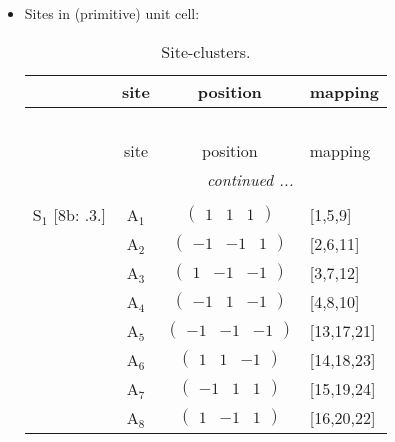 \documentclass[fleqn,10pt,landscape]{article}
\begin{document}
\begin{itemize}
\item Sites in (primitive) unit cell:
\begin{center}
\renewcommand{\arraystretch}{1.3}
\begin{longtable}{cc|c|l}
\caption{Site-clusters.}
 \\
 \hline \hline
 & site & position & mapping \\ \hline \endfirsthead

\multicolumn{3}{l}{\tablename\ \thetable{}} \\
 \hline \hline
 & site & position & mapping \\ \hline \endhead

 \hline \hline
\multicolumn{3}{r}{\footnotesize\it continued ...} \\ \endfoot

 \hline \hline
\multicolumn{3}{r}{} \\ \endlastfoot

S$_{1}$ [8b: .3.] & A$_1$ & $\begin{pmatrix} 1 & 1 & 1 \end{pmatrix}$ & [1,5,9] \\
& A$_2$ & $\begin{pmatrix} -1 & -1 & 1 \end{pmatrix}$ & [2,6,11] \\
& A$_3$ & $\begin{pmatrix} 1 & -1 & -1 \end{pmatrix}$ & [3,7,12] \\
& A$_4$ & $\begin{pmatrix} -1 & 1 & -1 \end{pmatrix}$ & [4,8,10] \\
& A$_5$ & $\begin{pmatrix} -1 & -1 & -1 \end{pmatrix}$ & [13,17,21] \\
& A$_6$ & $\begin{pmatrix} 1 & 1 & -1 \end{pmatrix}$ & [14,18,23] \\
& A$_7$ & $\begin{pmatrix} -1 & 1 & 1 \end{pmatrix}$ & [15,19,24] \\
& A$_8$ & $\begin{pmatrix} 1 & -1 & 1 \end{pmatrix}$ & [16,20,22] \\
\end{longtable}
\end{center}


\end{itemize}
\end{document}
